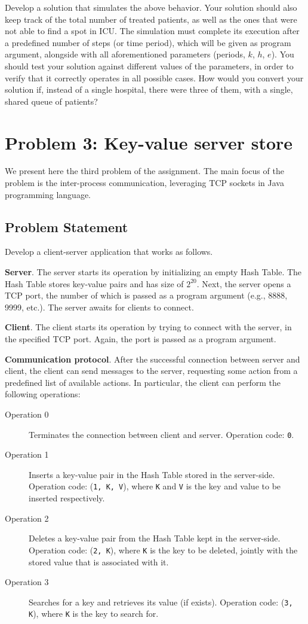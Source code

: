 \documentclass[acmlarge]{acmart}
\begin{document}
Develop a solution that simulates the above behavior. Your solution should also keep track of the total number of treated patients, as well as the ones that were not able to find a spot in ICU. The simulation must complete its execution after a predefined number of steps (or time period), which will be given as program argument, alongside with all aforementioned parameters (periods, $k$, $h$, $e$). You should test your solution against different values of the parameters, in order to verify that it correctly operates in all possible cases. How would you convert your solution if, instead of a single hospital, there were three of them, with a single, shared queue of patients?

\section{Problem 3: Key-value server store}
\label{section:problem3}
We present here the third problem of the assignment. The main focus of the problem is the inter-process communication, leveraging TCP sockets in Java programming language.

\subsection{Problem Statement}
Develop a client-server application that works as follows.

\textbf{Server}. The server starts its operation by initializing an empty Hash Table. The Hash Table stores key-value pairs and has size of $2^{20}$. Next, the server opens a TCP port, the number of which is passed as a program argument (e.g., 8888, 9999, etc.). The server awaits for clients to connect.

\textbf{Client}. The client starts its operation by trying to connect with the server, in the specified TCP port. Again, the port is passed as a program argument.

\textbf{Communication protocol}. After the successful connection between server and client, the client can send messages to the server, requesting some action from a predefined list of available actions. In particular, the client can perform the following operations:
\begin{description}
  \item[Operation 0] Terminates the connection between client and server. Operation code: \texttt{0}.
  \item[Operation 1] Inserts a key-value pair in the Hash Table stored in the server-side. Operation code: (\texttt{1, K, V}), where \texttt{K} and \texttt{V} is the key and value to be inserted respectively.
  \item[Operation 2] Deletes a key-value pair from the Hash Table kept in the server-side. Operation code: (\texttt{2, K}), where \texttt{K} is the key to be deleted, jointly with the stored value that is associated with it.
  \item[Operation 3] Searches for a key and retrieves its value (if exists). Operation code: (\texttt{3, K}), where \texttt{K} is the key to search for.
\end{description}
\end{document}

